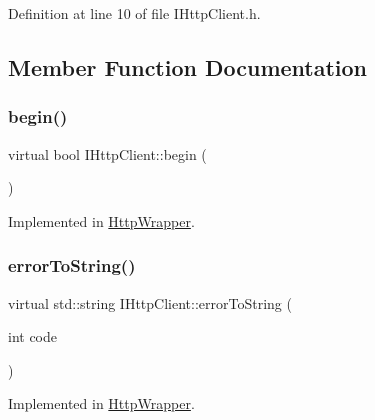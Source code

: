 Definition at line 10 of file I\+Http\+Client.\+h.



\subsection{Member Function Documentation}
\mbox{\label{class_i_http_client_a8975ccaf71b99eef3f85f86a56878d93}} 
\subsubsection{\texorpdfstring{begin()}{begin()}}
{\footnotesize\ttfamily virtual bool I\+Http\+Client\+::begin (\begin{DoxyParamCaption}{ }\end{DoxyParamCaption})\hspace{0.3cm}{\ttfamily [pure virtual]}}



Implemented in \hyperlink{class_http_wrapper_ad93bf7eb4c3d84f3b49a8b9673c207f6}{Http\+Wrapper}.

\mbox{\label{class_i_http_client_a7e7b1f6846e06a81242fbfdb2e328016}} 
\subsubsection{\texorpdfstring{error\+To\+String()}{errorToString()}}
{\footnotesize\ttfamily virtual std\+::string I\+Http\+Client\+::error\+To\+String (\begin{DoxyParamCaption}\item[{int}]{code }\end{DoxyParamCaption})\hspace{0.3cm}{\ttfamily [pure virtual]}}



Implemented in \hyperlink{class_http_wrapper_a9d75ef86fdb6e26d6835a774442eeb9f}{Http\+Wrapper}.

\mbox{\label{class_i_http_client_a3bf91f2161617983a11228fdc69298b8}} 
